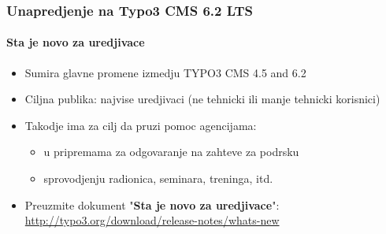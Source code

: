 \begin{frame}[fragile]
	\frametitle{Unapredjenje na Typo3 CMS 6.2 LTS}
	\framesubtitle{Sta je novo za uredjivace}

	\begin{itemize}
		\item Sumira glavne promene izmedju  TYPO3 CMS 4.5 and 6.2
		\item Ciljna publika: najvise uredjivaci (ne tehnicki ili manje tehnicki korisnici)
		\item Takodje ima za cilj da pruzi pomoc agencijama:

			\begin{itemize}
				\item u pripremama za odgovaranje na zahteve za podrsku
				\item sprovodjenju radionica, seminara, treninga, itd.
			\end{itemize}

		\item Preuzmite dokument "\textbf{Sta je novo za uredjivace}":\newline
			\smaller\url{http://typo3.org/download/release-notes/whats-new}\normalsize

	\end{itemize}

\end{frame}


